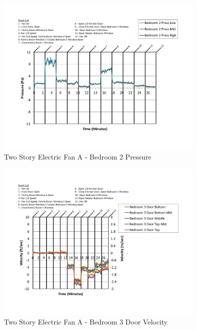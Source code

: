 \documentclass{article}
\begin{document}
\begin{appendices}
	\begin{figure}[H]
		\centering
		\includegraphics[height=3.05in,trim=0.67in 1.1in 0.67in 0.8in,clip=true]{0_Images/Results_Charts/ColdFlow/Two_Story/Electric/A/Bedroom_2_Pressure.pdf}
		\caption{Two Story Electric Fan A - Bedroom 2 Pressure}
	\end{figure}
 

	\begin{figure}[H]
		\centering
		\includegraphics[height=3.05in,trim=0.67in 1.1in 0.67in 0.8in,clip=true]{0_Images/Results_Charts/ColdFlow/Two_Story/Electric/A/Bedroom_3_Door_Velocity.pdf}
		\caption{Two Story Electric Fan A - Bedroom 3 Door Velocity}
	\end{figure}
 
	\clearpage


\end{appendices}
\end{document}
